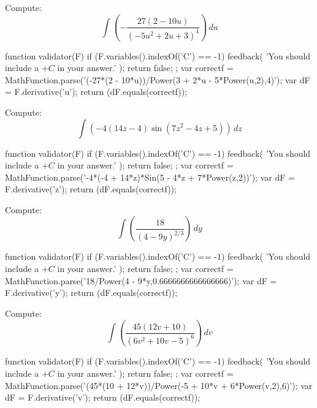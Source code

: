 \documentclass{ximera}
\renewcommand{\d}{\, d}
\begin{document}
\begin{exercise}
Compute: 
\[
\int \left(-\frac{27 (2-10 u)}{\left(-5 u^2+2 u+3\right)^4}\right)\d u
\]
\begin{expressionAnswer}
     function validator(F) {
      if (F.variables().indexOf('C') == -1) {
        feedback( 'You should include a $+C$ in your answer.' );
        return false;
      };      
      var correctf = MathFunction.parse('(-27*(2 - 10*u))/Power(3 + 2*u - 5*Power(u,2),4)');
      var dF = F.derivative('u');
      return (dF.equals(correctf));
    }
\end{expressionAnswer}
\end{exercise}



\begin{exercise}
Compute: 
\[
\int \left(-4 (14 z-4) \sin \left(7 z^2-4 z+5\right)\right)\d z
\]
\begin{expressionAnswer}
     function validator(F) {
      if (F.variables().indexOf('C') == -1) {
        feedback( 'You should include a $+C$ in your answer.' );
        return false;
      };      
      var correctf = MathFunction.parse('-4*(-4 + 14*z)*Sin(5 - 4*z + 7*Power(z,2))');
      var dF = F.derivative('z');
      return (dF.equals(correctf));
    }
\end{expressionAnswer}
\end{exercise}



\begin{exercise}
Compute: 
\[
\int \left(\frac{18}{(4-9 y)^{2/3}}\right)\d y
\]
\begin{expressionAnswer}
     function validator(F) {
      if (F.variables().indexOf('C') == -1) {
        feedback( 'You should include a $+C$ in your answer.' );
        return false;
      };      
      var correctf = MathFunction.parse('18/Power(4 - 9*y,0.6666666666666666)');
      var dF = F.derivative('y');
      return (dF.equals(correctf));
    }
\end{expressionAnswer}
\end{exercise}



\begin{exercise}
Compute: 
\[
\int \left(\frac{45 (12 v+10)}{\left(6 v^2+10 v-5\right)^6}\right)\d v
\]
\begin{expressionAnswer}
     function validator(F) {
      if (F.variables().indexOf('C') == -1) {
        feedback( 'You should include a $+C$ in your answer.' );
        return false;
      };      
      var correctf = MathFunction.parse('(45*(10 + 12*v))/Power(-5 + 10*v + 6*Power(v,2),6)');
      var dF = F.derivative('v');
      return (dF.equals(correctf));
    }
\end{expressionAnswer}
\end{exercise}
\end{document}
